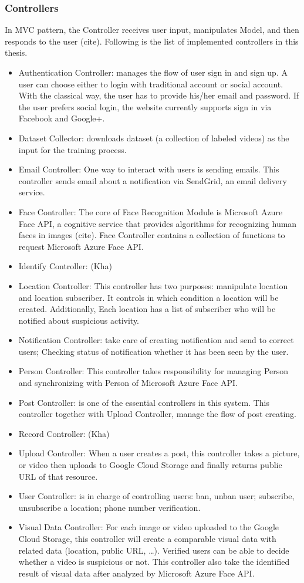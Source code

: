 \subsubsection{Controllers}
In MVC pattern, the Controller receives user input, manipulates Model, and then responds to the user (cite). Following is the list of implemented controllers in this thesis.
\begin{itemize}
	\item Authentication Controller: manages the flow of user sign in and sign up. A user can choose either to login with traditional account or social account. With the classical way, the user has to provide his/her email and password. If the user prefers social login, the website currently supports sign in via Facebook and Google+.
	\item Dataset Collector: downloads dataset (a collection of labeled videos) as the input for the training process.
	\item Email Controller: One way to interact with users is sending emails. This controller sends email about a notification via SendGrid, an email delivery service.
	\item Face Controller: The core of Face Recognition Module is Microsoft Azure Face API, a cognitive service that provides algorithms for recognizing human faces in images (cite). Face Controller contains a collection of functions to request Microsoft Azure Face API.
	\item Identify Controller: (Kha)
	\item Location Controller: This controller has two purposes: manipulate location and location subscriber. It controls in which condition a location will be created. Additionally, Each location has a list of subscriber who  will be notified about suspicious activity.
	\item Notification Controller:  take care of creating notification and send to correct users; Checking status of notification whether it has been seen by the user.
	\item Person Controller: This controller takes responsibility for managing Person and synchronizing with Person of Microsoft Azure Face API.
	\item Post Controller: is one of the essential controllers in this system. This controller together with Upload Controller, manage the flow of post creating.
	\item Record Controller: (Kha)
	\item Upload Controller: When a user creates a post, this controller takes a picture, or video then uploads to Google Cloud Storage and finally returns public URL of that resource.
	\item User Controller: is in charge of controlling users: ban, unban user; subscribe, unsubscribe a location; phone number verification.
	\item Visual Data Controller: For each image or video uploaded to the Google Cloud Storage, this controller will create a comparable visual data with related data (location, public URL, …). Verified users can be able to decide whether a video is suspicious or not. This controller also take the identified result of visual data after analyzed by Microsoft Azure Face API.    
\end{itemize}
